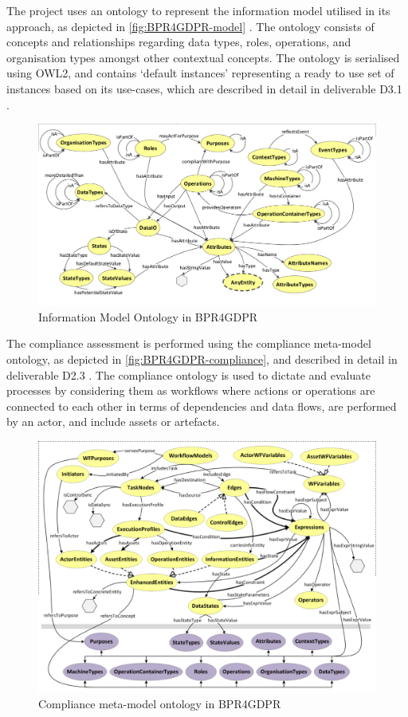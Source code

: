 The project uses an ontology to represent the information model utilised in its approach, as depicted in \autoref{fig:BPR4GDPR-model} \cite{lioudakis_d3.1_2019}. The ontology consists of concepts and relationships regarding data types, roles, operations, and organisation types amongst other contextual concepts.
The ontology is serialised using OWL2, and contains `default instances' representing a ready to use set of instances based on its use-cases, which are described in detail in deliverable D3.1 \cite{lioudakis_d3.1_2019}. 
\begin{figure}[htbp]
    \centering
    \includegraphics[width=0.8\linewidth]{img/BPR4GDPR_model.png}
    \caption{Information Model Ontology in BPR4GDPR \cite{lioudakis_d3.1_2019}}
    \label{fig:BPR4GDPR-model}
\end{figure}

The compliance assessment is performed using the compliance meta-model ontology, as depicted in \autoref{fig:BPR4GDPR-compliance}, and described in detail in deliverable D2.3 \cite{dellas_d2.3_2019}. The compliance ontology is used to dictate and evaluate processes by considering them as workflows where actions or operations are connected to each other in terms of dependencies and data flows, are performed by an actor, and include assets or artefacts.
\begin{figure}[htbp]
    \centering
    \includegraphics[width=0.8\linewidth]{img/BPR4GDPR_compliance.png}
    \caption{Compliance meta-model ontology in BPR4GDPR \cite{dellas_d2.3_2019}}
    \label{fig:BPR4GDPR-compliance}
\end{figure}


